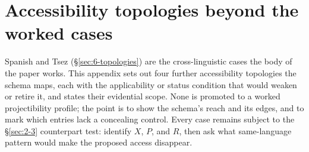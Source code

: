 \section{Accessibility topologies beyond the worked cases}\label{sec:B}

Spanish and Tsez (§\ref{sec:6-topologies}) are the cross-linguistic cases the body of the paper works. This appendix sets out four further accessibility topologies the schema maps, each with the applicability or status condition that would weaken or retire it, and states their evidential scope. None is promoted to a worked projectibility profile; the point is to show the schema's reach and its edges, and to mark which entries lack a concealing control. Every case remains subject to the §\ref{sec:2-3} counterpart test: identify $X$, $P$, and $R$, then ask what same-language pattern would make the proposed access disappear.

